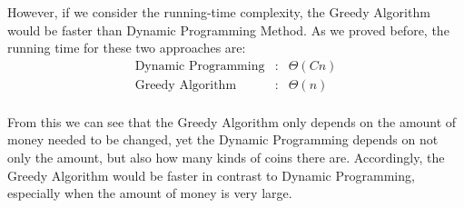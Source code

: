\documentclass[11pt]{scrreprt}
\begin{document}
However, if we consider the running-time complexity, the Greedy Algorithm would be faster than Dynamic Programming Method. As we proved before, the running time for these two approaches are:
\begin{eqnarray*}
\mbox{Dynamic Programming}&:& \Theta(Cn)\\
\mbox{Greedy Algorithm}&:& \Theta(n)\\
\end{eqnarray*}

From this we can see that the Greedy Algorithm only depends on the amount of money needed to be changed, yet the Dynamic Programming depends on not only the amount, but also how many kinds of coins there are. Accordingly, the Greedy Algorithm would be faster in contrast to Dynamic Programming, especially when the amount of money is very large.
\end{document}
